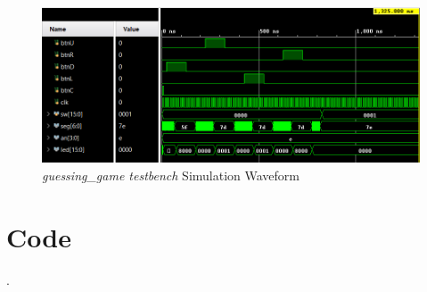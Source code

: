 \documentclass[11pt]{article}
\begin{document}
\begin{figure}[ht]\centering
	\includegraphics[width=1.1\textwidth]{gguesstest}
	\caption{\textit{guessing\_game testbench} Simulation Waveform}
	\label{fig:sim_with_table}
\end{figure}

\clearpage

\section*{Code}
.
\end{document}
